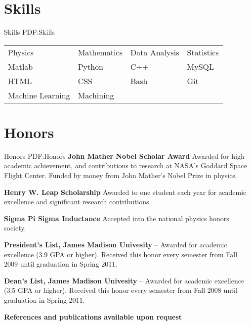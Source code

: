 \documentclass[letterpaper,MMMyyyy,nonstop]{simpleresumecv}
\begin{document}
\begin{body}

\section
{Skills}
{Skills}
{PDF:Skills}

\Gap
\begin{tabular}{llll}
Physics & Mathematics & Data Analysis & Statistics\\
Matlab & Python & C++ & MySQL\\
HTML & CSS & Bash & Git \\
Machine Learning & Machining & 
\end{tabular}


\section
{Honors}
{Honors}
{PDF:Honors}
\textbf{John Mather Nobel Scholar Award}
\hfill
{}
\BulletItem
Awarded for high academic achievement, and contributions to research at NASA's Goddard Space Flight Center.  Funded by money from John Mather's Nobel Prize in physics.


\textbf{Henry W. Leap Scholarship}
\hfill
{}
\BulletItem
Awarded to one student each year for academic excellence and significant research contributions.

\textbf{Sigma Pi Sigma Inductance}
\hfill
{}
\BulletItem
Accepted into the national physics honors society.

\textbf{President's List, James Madison Univesity}
\hfill
{} -- 
\BulletItem
Awarded for academic excellence (3.9 GPA or higher).  Received this honor every semester from Fall 2009 until graduation in Spring 2011.

\textbf{Dean's List, James Madison Univesity}
\hfill
{} --
\BulletItem
Awarded for academic excellence (3.5 GPA or higher).  Received this honor every semester from Fall 2008 until graduation in Spring 2011.

\BigGap
\Gap
\textbf{ References and publications available upon request}

\end{body}
\end{document}
